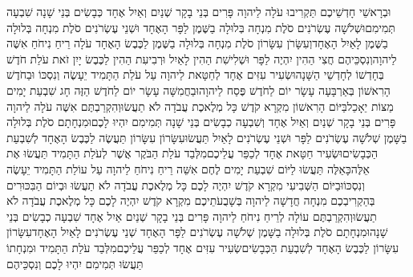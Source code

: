 \documentclass[../main/main.tex]{subfiles}
\begin{document}
\begin{multicols}{\ncols}
וּבְרָאשֵׁי חָדְשֵׁיכֶם תַּקְרִיבוּ עֹלָה לַיהוָה פָּרִים בְּנֵי בָקָר שְׁנַיִם וְאַיִל אֶחָד כְּבָשִׂים בְּנֵי שָׁנָה שִׁבְעָה תְּמִימִם\PreVerseSpace{}וּשְׁלֹשָׁה עֶשְׂרֹנִים סֹלֶת מִנְחָה בְּלוּלָה בַשֶּׁמֶן לַפָּר הָאֶחָד וּשְׁנֵי עֶשְׂרֹנִים סֹלֶת מִנְחָה בְּלוּלָה בַשֶּׁמֶן לָאַיִל הָאֶחָד\PreVerseSpace{}וְעִשָּׂרֹן עִשָּׂרוֹן סֹלֶת מִנְחָה בְּלוּלָה בַשֶּׁמֶן לַכֶּבֶשׂ הָאֶחָד עֹלָה רֵיחַ נִיחֹחַ אִשֶּׁה לַיהוָה\PreVerseSpace{}וְנִסְכֵּיהֶם חֲצִי הַהִין יִהְיֶה לַפָּר וּשְׁלִישִׁת הַהִין לָאַיִל וּרְבִיעִת הַהִין לַכֶּבֶשׂ יָיִן זֹאת עֹלַת חֹדֶשׁ בְּחָדְשׁוֹ לְחָדְשֵׁי הַשָּׁנָה\PreVerseSpace{}וּשְׂעִיר עִזִּים אֶחָד לְחַטָּאת לַיהוָה עַל עֹלַת הַתָּמִיד יֵעָשֶׂה וְנִסְכּוֹ \ClosedSection{}וּבַחֹדֶשׁ הָרִאשׁוֹן בְּאַרְבָּעָה עָשָׂר יוֹם לַחֹדֶשׁ פֶּסַח לַיהוָה\PreVerseSpace{}וּבַחֲמִשָּׁה עָשָׂר יוֹם לַחֹדֶשׁ הַזֶּה חָג שִׁבְעַת יָמִים מַצּוֹת יֵאָכֵל\PreVerseSpace{}בַּיּוֹם הָרִאשׁוֹן מִקְרָא קֹדֶשׁ כָּל מְלֶאכֶת עֲבֹדָה לֹא תַעֲשׂוּ\PreVerseSpace{}וְהִקְרַבְתֶּם אִשֶּׁה עֹלָה לַיהוָה פָּרִים בְּנֵי בָקָר שְׁנַיִם וְאַיִל אֶחָד וְשִׁבְעָה כְבָשִׂים בְּנֵי שָׁנָה תְּמִימִם יִהְיוּ לָכֶם\PreVerseSpace{}וּמִנְחָתָם סֹלֶת בְּלוּלָה בַשָּׁמֶן שְׁלֹשָׁה עֶשְׂרֹנִים לַפָּר וּשְׁנֵי עֶשְׂרֹנִים לָאַיִל תַּעֲשׂוּ\PreVerseSpace{}עִשָּׂרוֹן עִשָּׂרוֹן תַּעֲשֶׂה לַכֶּבֶשׂ הָאֶחָד לְשִׁבְעַת הַכְּבָשִׂים\PreVerseSpace{}וּשְׂעִיר חַטָּאת אֶחָד לְכַפֵּר עֲלֵיכֶם\PreVerseSpace{}מִלְּבַד עֹלַת הַבֹּקֶר אֲשֶׁר לְעֹלַת הַתָּמִיד תַּעֲשׂוּ אֶת אֵלֶּה\PreVerseSpace{}כָּאֵלֶּה תַּעֲשׂוּ לַיּוֹם שִׁבְעַת יָמִים לֶחֶם אִשֵּׁה רֵיחַ נִיחֹחַ לַיהוָה עַל עוֹלַת הַתָּמִיד יֵעָשֶׂה וְנִסְכּוֹ\PreVerseSpace{}וּבַיּוֹם הַשְּׁבִיעִי מִקְרָא קֹדֶשׁ יִהְיֶה לָכֶם כָּל מְלֶאכֶת עֲבֹדָה לֹא תַעֲשׂוּ \ClosedSection{}וּבְיוֹם הַבִּכּוּרִים בְּהַקְרִיבְכֶם מִנְחָה חֲדָשָׁה לַיהוָה בְּשָׁבֻעֹתֵיכֶם מִקְרָא קֹדֶשׁ יִהְיֶה לָכֶם כָּל מְלֶאכֶת עֲבֹדָה לֹא תַעֲשׂוּ\PreVerseSpace{}וְהִקְרַבְתֶּם עוֹלָה לְרֵיחַ נִיחֹחַ לַיהוָה פָּרִים בְּנֵי בָקָר שְׁנַיִם אַיִל אֶחָד שִׁבְעָה כְבָשִׂים בְּנֵי שָׁנָה\PreVerseSpace{}וּמִנְחָתָם סֹלֶת בְּלוּלָה בַשָּׁמֶן שְׁלֹשָׁה עֶשְׂרֹנִים לַפָּר הָאֶחָד שְׁנֵי עֶשְׂרֹנִים לָאַיִל הָאֶחָד\PreVerseSpace{}עִשָּׂרוֹן עִשָּׂרוֹן לַכֶּבֶשׂ הָאֶחָד לְשִׁבְעַת הַכְּבָשִׂים\PreVerseSpace{}שְׂעִיר עִזִּים אֶחָד לְכַפֵּר עֲלֵיכֶם\PreVerseSpace{}מִלְּבַד עֹלַת הַתָּמִיד וּמִנְחָתוֹ תַּעֲשׂוּ תְּמִימִם יִהְיוּ לָכֶם וְנִסְכֵּיהֶם\OpenSection{}\par

\end{multicols}
\end{document}
